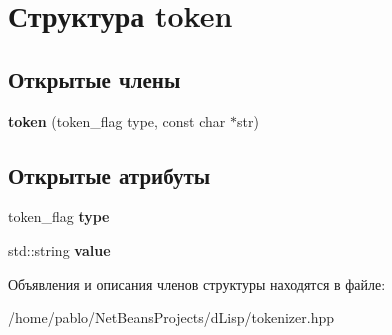 \hypertarget{structtoken}{}\section{Структура token}
\label{structtoken}
\subsection*{Открытые члены}
\begin{DoxyCompactItemize}
\item 
\mbox{\label{structtoken_aa87b4aa0605b95aaa5d5025a8b08c036}} 
{\bfseries token} (token\+\_\+flag type, const char $\ast$str)
\end{DoxyCompactItemize}
\subsection*{Открытые атрибуты}
\begin{DoxyCompactItemize}
\item 
\mbox{\label{structtoken_a1100177b59da20ffc298ada3d67c32e4}} 
token\+\_\+flag {\bfseries type}
\item 
\mbox{\label{structtoken_aebc1e280e783cda819ca694efcbeb59a}} 
std\+::string {\bfseries value}
\end{DoxyCompactItemize}


Объявления и описания членов структуры находятся в файле\+:\begin{DoxyCompactItemize}
\item 
/home/pablo/\+Net\+Beans\+Projects/d\+Lisp/tokenizer.\+hpp\end{DoxyCompactItemize}
